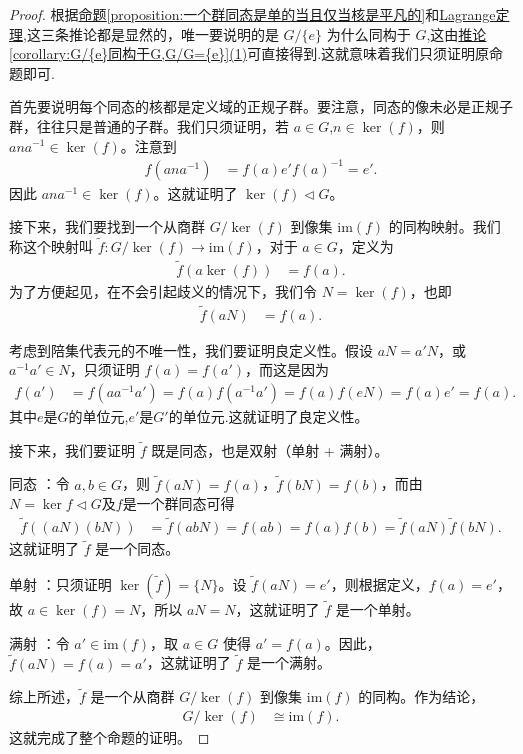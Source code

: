 \documentclass[../../main.tex]{subfiles}
\begin{document}
\begin{proof}
根据\hyperref[proposition:一个群同态是单的当且仅当核是平凡的]{命题\ref{proposition:一个群同态是单的当且仅当核是平凡的}}和\hyperref[theorem:Lagrange定理]{Lagrange定理},这三条推论都是显然的，唯一要说明的是 \(G/\{e\}\) 为什么同构于 \(G\),这由\hyperref[corollary:G/{e}同构于G,G/G={e}]{推论\ref{corollary:G/{e}同构于G,G/G={e}}(1)}可直接得到.这就意味着我们只须证明原命题即可.

首先要说明每个同态的核都是定义域的正规子群。要注意，同态的像未必是正规子群，往往只是普通的子群。我们只须证明，若 \(a \in G\),\(n \in \ker(f)\)，则 \(ana^{-1} \in \ker(f)\)。注意到
\begin{align*}
f(ana^{-1}) &= f(a)e'f(a)^{-1} = e' .
\end{align*}
因此 \(ana^{-1} \in \ker(f)\)。这就证明了 \(\ker(f) \lhd G\)。

接下来，我们要找到一个从商群 \(G/\ker(f)\) 到像集 \(\mathrm{im}(f)\) 的同构映射。我们称这个映射叫 \(\tilde{f}: G/\ker(f) \to \mathrm{im}(f)\)，对于 \(a \in G\)，定义为
\begin{align*}
\tilde{f}(a\ker(f)) &= f(a) .
\end{align*}
为了方便起见，在不会引起歧义的情况下，我们令 \(N = \ker(f)\)，也即
\begin{align*}
\tilde{f}(aN) &= f(a) .
\end{align*}

考虑到陪集代表元的不唯一性，我们要证明良定义性。假设 \(aN = a'N\)，或 \(a^{-1}a' \in N\)，只须证明 \(f(a) = f(a')\)，而这是因为
\begin{align*}
f(a') &= f(aa^{-1}a') = f(a)f(a^{-1}a') =f(a)f(eN)= f(a)e' = f(a) .
\end{align*}
其中$e$是$G$的单位元,$e'$是$G'$的单位元.这就证明了良定义性。

接下来，我们要证明 \(\tilde{f}\) 既是同态，也是双射（单射 + 满射）。

同态 ：令 \(a, b \in G\)，则 \(\tilde{f}(aN) = f(a)\)，\(\tilde{f}(bN) = f(b)\)，而由$N=\ker f \lhd G$及$f$是一个群同态可得
\begin{align*}
\tilde{f}((aN)(bN)) &= \tilde{f}(abN) = f(ab) = f(a)f(b) = \tilde{f}(aN)\tilde{f}(bN) .
\end{align*}
这就证明了 \(\tilde{f}\) 是一个同态。

单射 ：只须证明 \(\ker(\tilde{f}) = \{N\}\)。设 \(\tilde{f}(aN) = e'\)，则根据定义，\(f(a) = e'\)，故 \(a \in \ker(f) = N\)，所以 \(aN = N\)，这就证明了 \(\tilde{f}\) 是一个单射。

满射 ：令 \(a' \in \mathrm{im}(f)\)，取 \(a \in G\) 使得 \(a' = f(a)\)。因此，\(\tilde{f}(aN) = f(a) = a'\)，这就证明了 \(\tilde{f}\) 是一个满射。

综上所述，\(\tilde{f}\) 是一个从商群 \(G/\ker(f)\) 到像集 \(\mathrm{im}(f)\) 的同构。作为结论，
\begin{align*}
G/\ker(f) &\cong \mathrm{im}(f) .
\end{align*}
这就完成了整个命题的证明。 
\end{proof}
\end{document}
